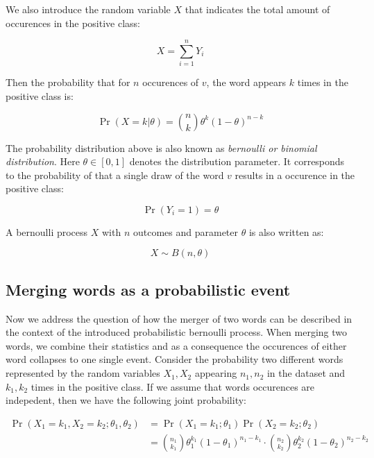 We also introduce the random variable $X$ that indicates the total
amount of occurences in the positive class:

\begin{equation*}
	X = \sum\limits_{i=1}^n Y_i
\end{equation*}

Then the probability that for $n$ occurences of $v$, the word appears $k$ times
in the positive class is: 

\begin{equation*}
	\Pr(X=k|\theta) = \binom{n}{k} \theta^k(1-\theta)^{n-k}
\end{equation*}

The probability distribution above is also known as \emph{bernoulli or binomial
distribution}. Here $\theta \in [0,1]$ denotes the distribution parameter.
It corresponds to the probability of that a single draw of the word $v$ results in
a occurence in the positive class:

\begin{equation*}
	\Pr(Y_i = 1) = \theta
\end{equation*}

A bernoulli process $X$ with $n$ outcomes  
and parameter $\theta$ is also written as:

\begin{equation*}
	X \sim B(n, \theta)
\end{equation*}

\subsection{Merging words as a probabilistic event}

Now we address the question of how the merger of two words can be described in
the context of the introduced probabilistic bernoulli process. 
When merging two words, we combine their statistics and as a consequence the
occurences of either word collapses to one single event. 
Consider the probability two different words represented by the random
variables $X_1, X_2$ appearing $n_1, n_2$ in the dataset and $k_1, k_2$ times in
the positive class. If we assume that words occurences are indepedent, then we
have the following joint probability:

\begin{equation*}
\begin{split}
	\Pr(X_1 = k_1, X_2 = k_2; \theta_1, \theta_2) &=
	\Pr(X_1=k_1;\theta_1)\Pr(X_2=k_2;\theta_2)
	\\
	&= 	\binom{n_1}{k_1}\theta_1^{k_1}(1-\theta_1)^{n_1-k_1} \cdot
	\binom{n_2}{k_2}\theta_2^{k_2}(1-\theta_2)^{n_2-k_2}
\end{split}
\end{equation*}

